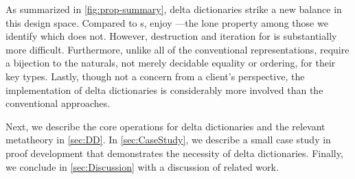 As summarized in \autoref{fig:prop-summary}, delta dictionaries strike a new balance in this design space.
%
Compared to \cal{}s, \dds{} enjoy \SemTot{}---the lone property among those we identify which \cal{} does not.
%
However, destruction and iteration for \dds{} is substantially more difficult.
%
Furthermore, unlike all of the conventional representations, \dds{} require a bijection to the naturals, not merely decidable equality or ordering, for their key types.
%
%
Lastly, though not a concern from a client's perspective, the implementation of delta dictionaries is considerably more involved than the conventional approaches.





%
%
Next, we describe the core operations for delta dictionaries and the relevant metatheory in \autoref{sec:DD}.
%
In \autoref{sec:CaseStudy}, we describe a small case study in proof development that demonstrates the necessity of delta dictionaries.
%
Finally, we conclude in \autoref{sec:Discussion} with a discussion of related work.
%


